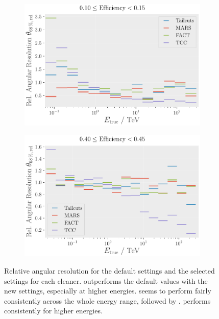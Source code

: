 \begin{figure}
    \centering
    \begin{subfigure}[t]{0.45\textwidth}
        \centering
        \includegraphics[width=\textwidth]{plots/ar_aeff/Rel_AR_0.10_0.15_base.pdf}
    \end{subfigure}
    \hfill
    \begin{subfigure}[t]{0.45\textwidth}
        \centering
        \includegraphics[width=\textwidth]{plots/ar_aeff/Rel_AR_0.40_0.45_base.pdf}
    \end{subfigure}
    \caption{Relative angular resolution for the default settings and the selected settings for each cleaner.
    \tcc{} outperforms the default values with the new settings, especially at higher energies. \mars{} seems
    to perform fairly consistently across the whole energy range, followed by \tailcuts{}. \fact{} performs
    consistently for higher energies.}
    \label{fig:rel_angres}
\end{figure}

